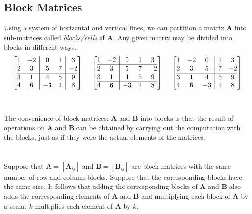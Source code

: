 \documentclass[../setup.tex]{subfiles}
\newcommand{\tab}{\ \ \ \ }
\begin{document}
\subsection{Block Matrices}
Using a system of horizontal and vertical lines, we can partition a matrix $\bm{A}$ into sub-matrices called \textit{blocks/cells} of $\bm{A}$. Any given matrix may be divided into blocks in different ways.  \\
\[
  \left[\begin{array}{@{}cc|cc|c@{}}
    1 & -2 & 0 & 1 & 3 \\
    2 & 3 & 5 & 7 & -2 \\
\hline
    3 & 1 & 4 & 5 & 9 \\
    4 & 6 & -3 & 1 & 8 \\
  \end{array}\right]
\tab
  \left[\begin{array}{@{}cc|ccc@{}}
    1 & -2 & 0 & 1 & 3 \\
\hline
    2 & 3 & 5 & 7 & -2 \\
    3 & 1 & 4 & 5 & 9 \\
\hline
    4 & 6 & -3 & 1 & 8 \\
  \end{array}\right]
\tab 
  \left[\begin{array}{@{}ccc|cc@{}}
    1 & -2 & 0 & 1 & 3 \\
    2 & 3 & 5 & 7 & -2 \\
\hline
    3 & 1 & 4 & 5 & 9 \\
    4 & 6 & -3 & 1 & 8 \\
  \end{array}\right]
\]
\phantom \\ \\
The convenience of block matrices; $\bm{A}$ and $\bm{B}$ into blocks is that the result of operations on $\bm{A}$ and $\bm{B}$ can be obtained by carrying out the computation with the blocks, just as if they were the actual elements of the matrices. \\
\phantom \\ \\
Suppose that $\bm{A} = [\bm{A}_{ij}]$ and $\bm{B} = [\bm{B}_{ij}]$ are block matrices with the same number of row and column blocks. Suppose that the corresponding blocks have the same size. It follows that adding the corresponding blocks of $\bm{A}$ and $\bm{B}$ also adds the corresponding elements of $\bm{A}$ and $\bm{B}$ and multiplying each block of $\bm{A}$ by a scalar $k$ multiplies each element of $\bm{A}$ by $k$. \\
\end{document}
